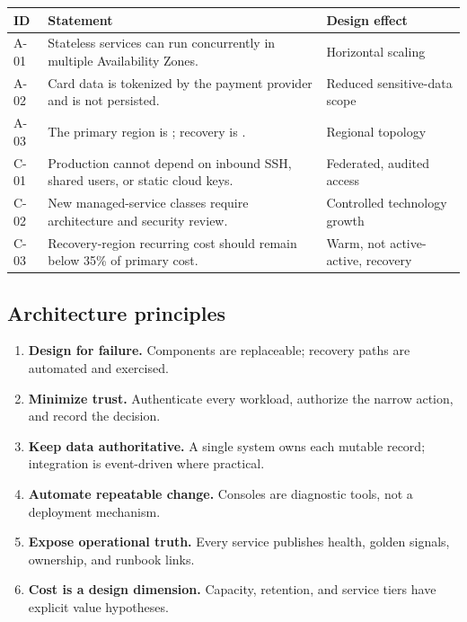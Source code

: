 \begin{tabularx}{\textwidth}{@{}C{12mm}Y L{35mm}@{}}
  \toprule
  \color{white}\textbf{ID} & \color{white}\textbf{Statement} & \color{white}\textbf{Design effect} \\
  \midrule
  A-01 & Stateless services can run concurrently in multiple Availability Zones. & Horizontal scaling \\
  A-02 & Card data is tokenized by the payment provider and is not persisted. & Reduced sensitive-data scope \\
  A-03 & The primary region is ; recovery is . & Regional topology \\
  C-01 & Production cannot depend on inbound SSH, shared users, or static cloud keys. & Federated, audited access \\
  C-02 & New managed-service classes require architecture and security review. & Controlled technology growth \\
  C-03 & Recovery-region recurring cost should remain below 35\% of primary cost. & Warm, not active-active, recovery \\
  \bottomrule
\end{tabularx}

\subsection{Architecture principles}

\begin{enumerate}
  \item \textbf{Design for failure.} Components are replaceable; recovery paths are automated and exercised.
  \item \textbf{Minimize trust.} Authenticate every workload, authorize the narrow action, and record the decision.
  \item \textbf{Keep data authoritative.} A single system owns each mutable record; integration is event-driven where practical.
  \item \textbf{Automate repeatable change.} Consoles are diagnostic tools, not a deployment mechanism.
  \item \textbf{Expose operational truth.} Every service publishes health, golden signals, ownership, and runbook links.
  \item \textbf{Cost is a design dimension.} Capacity, retention, and service tiers have explicit value hypotheses.
\end{enumerate}

